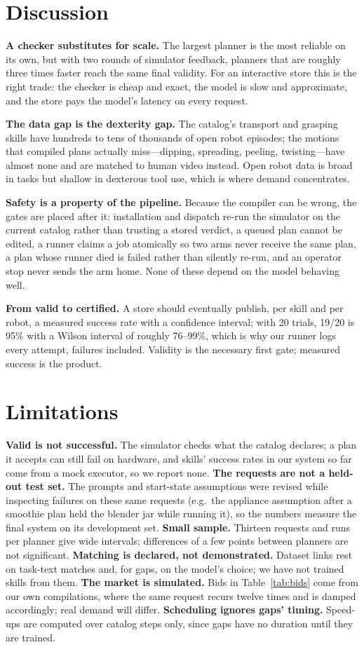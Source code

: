\documentclass[10pt,twocolumn,letterpaper]{article}
\begin{document}
\section{Discussion}
\textbf{A checker substitutes for scale.} The largest planner is the most reliable
on its own, but with two rounds of simulator feedback, planners that are roughly three
times faster reach the same final validity. For an interactive store this is
the right trade: the checker is cheap and exact, the model is slow and approximate,
and the store pays the model's latency on every request.

\textbf{The data gap is the dexterity gap.} The catalog's transport and grasping
skills have hundreds to tens of thousands of open robot episodes; the motions that
compiled plans actually miss---dipping, spreading, peeling, twisting---have almost
none and are matched to human video instead. Open robot data is broad in tasks but
shallow in dexterous tool use, which is where demand concentrates.

\textbf{Safety is a property of the pipeline.} Because the compiler can be wrong,
the gates are placed after it: installation and dispatch re-run the simulator on the
current catalog rather than trusting a stored verdict, a queued plan cannot be
edited, a runner claims a job atomically so two arms never receive the same plan, a
plan whose runner died is failed rather than silently re-run, and an operator stop
never sends the arm home. None of these depend on the model behaving well.

\textbf{From valid to certified.} A store should eventually publish, per skill and
per robot, a measured success rate with a confidence interval; with 20 trials,
19/20 is 95\% with a Wilson interval of roughly 76--99\%, which is why our runner
logs every attempt, failures included. Validity is the necessary first gate;
measured success is the product.

\section{Limitations}\label{sec:limits}
\textbf{Valid is not successful.} The simulator checks what the catalog declares;
a plan it accepts can still fail on hardware, and skills' success rates in our
system so far come from a mock executor, so we report none. \textbf{The requests
are not a held-out test set.} The prompts and start-state assumptions were
revised while inspecting failures on these same requests (e.g.\ the appliance
assumption after a smoothie plan held the blender jar while running it), so the
numbers measure the final system on its development set. \textbf{Small sample.}
Thirteen requests and \Runs{} runs per planner give wide intervals; differences of a
few points between planners are not significant. \textbf{Matching is declared, not
demonstrated.} Dataset links rest on task-text matches and, for gaps, on the model's
choice; we have not trained skills from them. \textbf{The market is simulated.}
Bids in Table~\ref{tab:bids} come from our own compilations, where the same request
recurs twelve times and is damped accordingly; real demand will differ.
\textbf{Scheduling ignores gaps' timing.} Speed-ups are computed over catalog steps
only, since gaps have no duration until they are trained.
\end{document}
